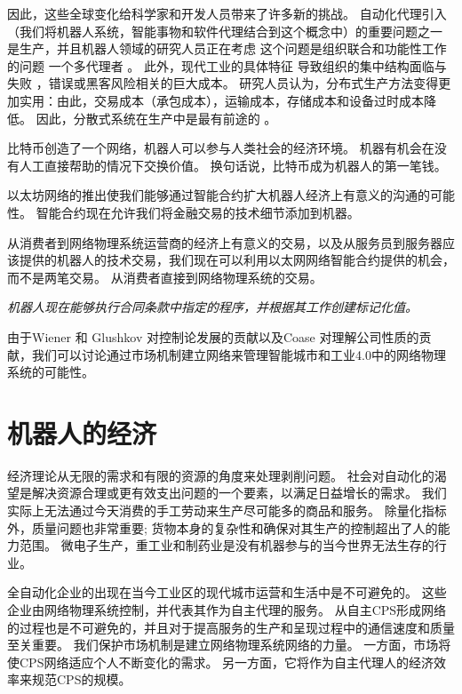 \documentclass[UTF8]{article}
\begin{document}
因此，这些全球变化给科学家和开发人员带来了许多新的挑战。 自动化代理引入（我们将机器人系统，智能事物和软件代理结合到这个概念中）的重要问题之一 \cite{Leitao2015IndustrialIndustry} 是生产，并且机器人领域的研究人员正在考虑 \cite{Zhu2014RobustSystems} 这个问题是组织联合和功能性工作的问题 一个多代理者 \cite{Liu2013Multi-robotConstraints} 。 此外，现代工业的具体特征 \cite{Lasi2014Industry4.0} 导致组织的集中结构面临与失败 \cite{Khajavi2014AdditiveChain}，错误或黑客风险相关的巨大成本。 研究人员认为，分布式生产方法变得更加实用：由此，交易成本（承包成本），运输成本，存储成本和设备过时成本降低。 因此，分散式系统在生产中是最有前途的 \cite{DeGennaro2006DecentralizedSystems}。

比特币创造了一个网络，机器人可以参与人类社会的经济环境。 机器有机会在没有人工直接帮助的情况下交换价值。 换句话说，比特币成为机器人的第一笔钱\cite{Kelion2015CouldThemselves}。

以太坊网络的推出使我们能够通过智能合约扩大机器人经济上有意义的沟通的可能性\cite{Buterin2014EthereumPlatform}。 智能合约现在允许我们将金融交易的技术细节添加到机器。


从消费者到网络物理系统运营商的经济上有意义的交易，以及从服务员到服务器应该提供的机器人的技术交易，我们现在可以利用以太网网络智能合约提供的机会，而不是两笔交易。 从消费者直接到网络物理系统的交易。

\textit{机器人现在能够执行合同条款中指定的程序，并根据其工作创建标记化值。}

由于Wiener \cite{Wiener1961CyberneticsEd} 和 Glushkov \cite{SergienkoIvan2014TopicalGlushkov} 对控制论发展的贡献以及Coase \cite{Coase1937TheFirm} 对理解公司性质的贡献，我们可以讨论通过市场机制建立网络来管理智能城市和工业4.0中的网络物理系统的可能性。

\section{机器人的经济}

经济理论从无限的需求和有限的资源的角度来处理剥削问题。 社会对自动化的渴望是解决资源合理或更有效支出问题的一个要素，以满足日益增长的需求。 我们实际上无法通过今天消费的手工劳动来生产尽可能多的商品和服务。 除量化指标外，质量问题也非常重要; 货物本身的复杂性和确保对其生产的控制超出了人的能力范围。 微电子生产，重工业和制药业是没有机器参与的当今世界无法生存的行业。

全自动化企业的出现在当今工业区的现代城市运营和生活中是不可避免的。 这些企业由网络物理系统控制，并代表其作为自主代理的服务。 从自主CPS形成网络的过程也是不可避免的，并且对于提高服务的生产和呈现过程中的通信速度和质量至关重要。 我们保护市场机制是建立网络物理系统网络的力量。 一方面，市场将使CPS网络适应个人不断变化的需求。
另一方面，它将作为自主代理人的经济效率来规范CPS的规模。
\end{document}

